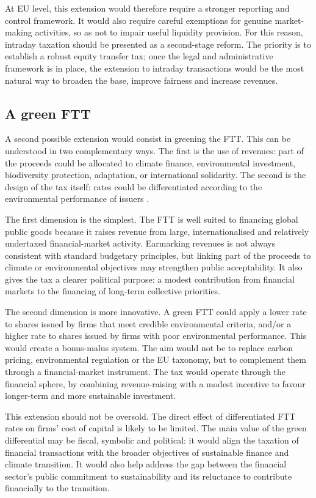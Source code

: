\documentclass[../main]{subfiles}
\begin{document}
At EU level, this extension would therefore require a stronger reporting and control framework. It would also require careful exemptions for genuine market-making activities, so as not to impair useful liquidity provision. For this reason, intraday taxation should be presented as a second-stage reform. The priority is to establish a robust equity transfer tax; once the legal and administrative framework is in place, the extension to intraday transactions would be the most natural way to broaden the base, improve fairness and increase revenues.

\subsection{A green FTT}

A second possible extension would consist in greening the FTT. This can be understood in two complementary ways. The first is the use of revenues: part of the proceeds could be allocated to climate finance, environmental investment, biodiversity protection, adaptation, or international solidarity. The second is the design of the tax itself: rates could be differentiated according to the environmental performance of issuers \citep{CapelleBlancardGreenFTT}.

The first dimension is the simplest. The FTT is well suited to financing global public goods because it raises revenue from large, internationalised and relatively undertaxed financial-market activity. Earmarking revenues is not always consistent with standard budgetary principles, but linking part of the proceeds to climate or environmental objectives may strengthen public acceptability. It also gives the tax a clearer political purpose: a modest contribution from financial markets to the financing of long-term collective priorities.

The second dimension is more innovative. A green FTT could apply a lower rate to shares issued by firms that meet credible environmental criteria, and/or a higher rate to shares issued by firms with poor environmental performance. This would create a bonus-malus system. The aim would not be to replace carbon pricing, environmental regulation or the EU taxonomy, but to complement them through a financial-market instrument. The tax would operate through the financial sphere, by combining revenue-raising with a modest incentive to favour longer-term and more sustainable investment.

This extension should not be oversold. The direct effect of differentiated FTT rates on firms' cost of capital is likely to be limited. The main value of the green differential may be fiscal, symbolic and political: it would align the taxation of financial transactions with the broader objectives of sustainable finance and climate transition. It would also help address the gap between the financial sector's public commitment to sustainability and its reluctance to contribute financially to the transition.
\end{document}
